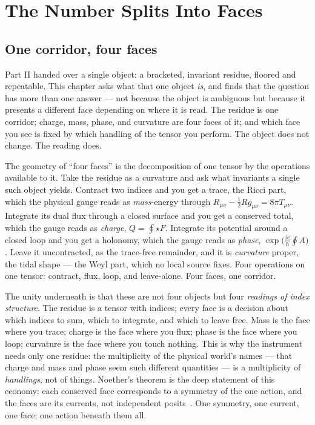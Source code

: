 \chapter{The Number Splits Into Faces}

\section{One corridor, four faces}

Part II handed over a single object: a bracketed, invariant residue, floored and repeatable. This chapter asks what that one
object \emph{is}, and finds that the question has more than one answer --- not because the object is ambiguous but because it
presents a different face depending on where it is read. The residue is one corridor; charge, mass, phase, and curvature are
four faces of it; and which face you see is fixed by which handling of the tensor you perform. The object does not change.
The reading does.

The geometry of ``four faces'' is the decomposition of one tensor by the operations available to it. Take the residue as a
curvature and ask what invariants a single such object yields. Contract two indices and you get a trace, the Ricci part,
which the physical gauge reads as \emph{mass}-energy through $R_{\mu\nu} - \tfrac12 R g_{\mu\nu} = 8\pi T_{\mu\nu}$. Integrate
its dual flux through a closed surface and you get a conserved total, which the gauge reads as \emph{charge}, $Q = \oint
\star F$. Integrate its potential around a closed loop and you get a holonomy, which the gauge reads as \emph{phase},
$\exp\!\big(\tfrac{ie}{\hbar}\oint A\big)$. Leave it uncontracted, as the trace-free remainder, and it is \emph{curvature}
proper, the tidal shape --- the Weyl part, which no local source fixes. Four operations on one tensor: contract, flux, loop,
and leave-alone. Four faces, one corridor.

The unity underneath is that these are not four objects but four \emph{readings of index structure}. The residue is a tensor
with indices; every face is a decision about which indices to sum, which to integrate, and which to leave free. Mass is the
face where you trace; charge is the face where you flux; phase is the face where you loop; curvature is the face where you
touch nothing. This is why the instrument needs only one residue: the multiplicity of the physical world's names --- that
charge and mass and phase seem such different quantities --- is a multiplicity of \emph{handlings}, not of things. Noether's
theorem is the deep statement of this economy: each conserved face corresponds to a symmetry of the one action, and the
faces are its currents, not independent posits~\cite{noether1918}. One symmetry, one current, one face; one action beneath
them all.

